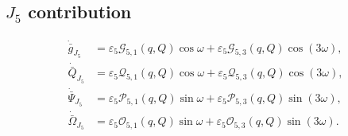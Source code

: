 \documentclass[10pt]{article}
\begin{document}
\subsection*{$J_5$ contribution}
\begin{align}
\dot{\bar g}_{J_5} &= \varepsilon_5 \mathcal{G}_{5,1}(q,Q)\cos\omega + \varepsilon_5 \mathcal{G}_{5,3}(q,Q)\cos(3\omega),\\
\dot{\bar Q}_{J_5} &= \varepsilon_5 \mathcal{Q}_{5,1}(q,Q)\cos\omega + \varepsilon_5 \mathcal{Q}_{5,3}(q,Q)\cos(3\omega),\\
\dot{\bar\Psi}_{J_5} &= \varepsilon_5 \mathcal{P}_{5,1}(q,Q)\sin\omega + \varepsilon_5 \mathcal{P}_{5,3}(q,Q)\sin(3\omega),\\
\dot{\bar\Omega}_{J_5} &= \varepsilon_5 \mathcal{O}_{5,1}(q,Q)\sin\omega + \varepsilon_5 \mathcal{O}_{5,3}(q,Q)\sin(3\omega).
\end{align}
\begingroup\footnotesize
\end{document}

